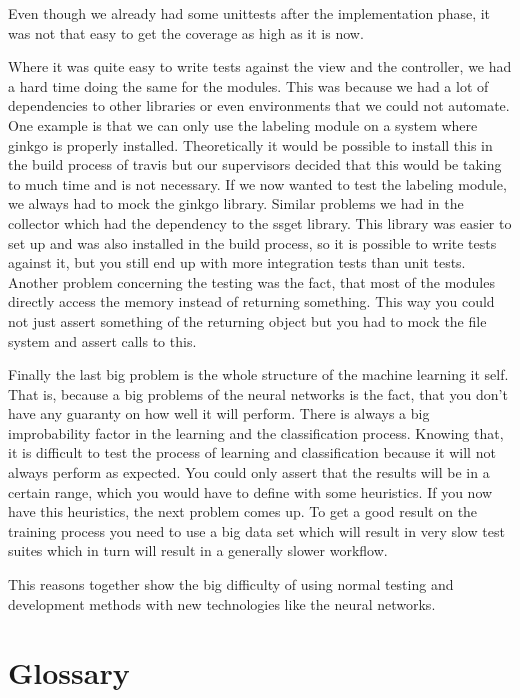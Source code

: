 \documentclass[parskip=full]{scrartcl}
\begin{document}
Even though we already had some \glspl{unittest} after the implementation phase, it was not that easy to get the coverage as high as it is now.


Where it was quite easy to write tests against the view and the controller, we had a hard time doing the same for the modules.
This was because we had a lot of dependencies to other libraries or even environments that we could not automate.
One example is that we can only use the labeling module on a system where \gls{ginkgo} is properly installed.
Theoretically it would be possible to install this in the build process of \gls{travis} but our supervisors decided that this would be taking to much time and is not necessary.
If we now wanted to test the labeling module, we always had to mock the \gls{ginkgo} library.
Similar problems we had in the collector which had the dependency to the \gls{ssget} library.
This library was easier to set up and was also installed in the build process, so it is possible to write tests against it, but you still end up with more integration tests than unit tests.
Another problem concerning the testing was the fact, that most of the modules directly access the memory instead of returning something.
This way you could not just assert something of the returning object but you had to mock the file system and assert calls to this.


Finally the last big problem is the whole structure of the machine learning it self.
That is, because a big problems of the neural networks is the fact, that you don't have any guaranty on how well it will perform.
There is always a big improbability factor in the learning and the classification process.
Knowing that, it is difficult to test the process of learning and classification because it will not always perform as expected.
You could only assert that the results will be in a certain range, which you would have to define with some heuristics.
If you now have this heuristics, the next problem comes up.
To get a good result on the training process you need to use a big data set which will result in very slow test suites which in turn will result in a generally slower workflow.


This reasons together show the big difficulty of using normal testing and development methods with new technologies like the neural networks.

\newpage

\section{Glossary}

%
\printnoidxglossaries
\end{document}
